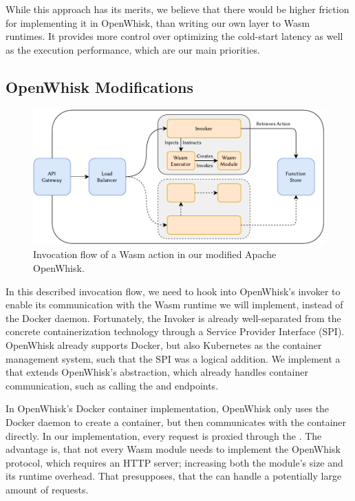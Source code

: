 While this approach has its merits, we believe that there would be higher friction for implementing it in OpenWhisk, than writing our own layer to Wasm runtimes. It provides more control over optimizing the cold-start latency as well as the execution performance, which are our main priorities.

\subsection{OpenWhisk Modifications}


\begin{figure}
    \includegraphics{figures/WasmOpenWhiskActionInvocationFlow.pdf}
    \caption{Invocation flow of a Wasm action in our modified Apache OpenWhisk.}
    \label{fig:wasm-openwhisk-action-invocation-flow}
\end{figure}

In this described invocation flow, we need to hook into OpenWhisk's invoker to enable its communication with the Wasm runtime we will implement, instead of the Docker daemon. Fortunately, the Invoker is already well-separated from the concrete containerization technology through a Service Provider Interface (SPI). OpenWhisk already supports Docker, but also Kubernetes as the container management system, such that the SPI was a logical addition. We implement a  that extends OpenWhisk's  abstraction, which already handles container communication, such as calling the  and  endpoints.


In OpenWhisk's Docker container implementation, OpenWhisk only uses the Docker daemon to create a container, but then communicates with the container directly. In our implementation, every request is proxied through the . The advantage is, that not every Wasm module needs to implement the OpenWhisk protocol, which requires an HTTP server; increasing both the module's size and its runtime overhead. That presupposes, that the  can handle a potentially large amount of requests.

